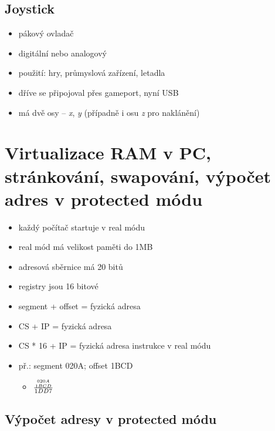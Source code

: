 \documentclass[a4paper,12pt]{article}
\providecommand{\tightlist}{%
\setlength{\itemsep}{0pt}\setlength{\parskip}{0pt}}
\begin{document}
\subsection{Joystick}

\begin{itemize}
\tightlist
\item pákový ovladač
\item digitální nebo analogový
\item použití: hry, průmyslová zařízení, letadla
\item dříve se připojoval přes gameport, nyní USB
\item má dvě osy -- \emph{x}, \emph{y} (případně i osu \emph{z} pro
  naklánění)
\end{itemize}

\section{Virtualizace RAM v PC, stránkování, swapování, výpočet adres v protected módu}

\begin{itemize}
\tightlist
\item každý počítač startuje v real módu
\item real mód má velikost paměti do 1MB
\item adresová sběrnice má 20 bitů
\item registry jsou 16 bitové
\item segment + offset = fyzická adresa
\item CS + IP = fyzická adresa
\item CS * 16 + IP = fyzická adresa instrukce v real módu
\item př.: segment 020A; offset 1BCD

  \begin{itemize}
  \tightlist
    \item[] $\frac{{{020A} \atop {1BCD}}}{1DD7}$
  \end{itemize}
\end{itemize}

\subsection{Výpočet adresy v protected módu}
\end{document}
